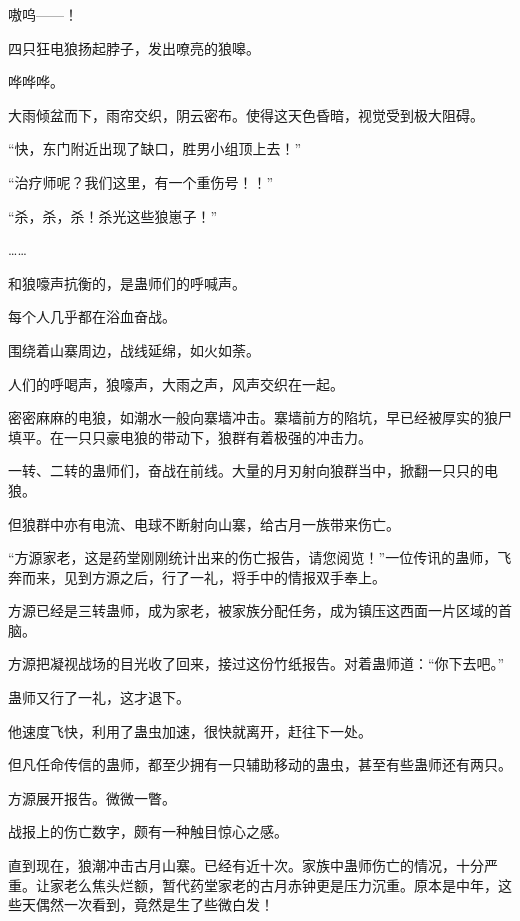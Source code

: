 
\begin{this_body}



嗷呜——！

四只狂电狼扬起脖子，发出嘹亮的狼嗥。

哗哗哗。

大雨倾盆而下，雨帘交织，阴云密布。使得这天色昏暗，视觉受到极大阻碍。

“快，东门附近出现了缺口，胜男小组顶上去！”

“治疗师呢？我们这里，有一个重伤号！！”

“杀，杀，杀！杀光这些狼崽子！”

……

和狼嚎声抗衡的，是蛊师们的呼喊声。

每个人几乎都在浴血奋战。

围绕着山寨周边，战线延绵，如火如荼。

人们的呼喝声，狼嚎声，大雨之声，风声交织在一起。

密密麻麻的电狼，如潮水一般向寨墙冲击。寨墙前方的陷坑，早已经被厚实的狼尸填平。在一只只豪电狼的带动下，狼群有着极强的冲击力。

一转、二转的蛊师们，奋战在前线。大量的月刃射向狼群当中，掀翻一只只的电狼。

但狼群中亦有电流、电球不断射向山寨，给古月一族带来伤亡。

“方源家老，这是药堂刚刚统计出来的伤亡报告，请您阅览！”一位传讯的蛊师，飞奔而来，见到方源之后，行了一礼，将手中的情报双手奉上。

方源已经是三转蛊师，成为家老，被家族分配任务，成为镇压这西面一片区域的首脑。

方源把凝视战场的目光收了回来，接过这份竹纸报告。对着蛊师道：“你下去吧。”

蛊师又行了一礼，这才退下。

他速度飞快，利用了蛊虫加速，很快就离开，赶往下一处。

但凡任命传信的蛊师，都至少拥有一只辅助移动的蛊虫，甚至有些蛊师还有两只。

方源展开报告。微微一瞥。

战报上的伤亡数字，颇有一种触目惊心之感。

直到现在，狼潮冲击古月山寨。已经有近十次。家族中蛊师伤亡的情况，十分严重。让家老么焦头烂额，暂代药堂家老的古月赤钟更是压力沉重。原本是中年，这些天偶然一次看到，竟然是生了些微白发！


\end{this_body}
